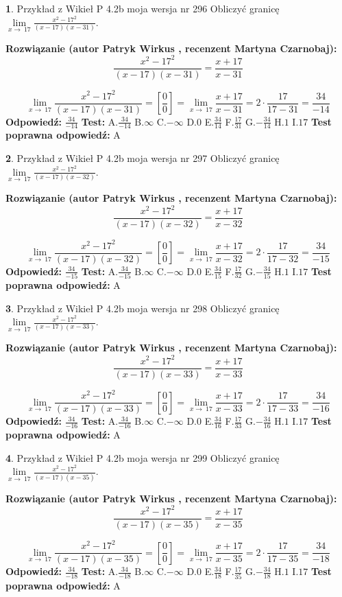 \documentclass[12pt, a4paper]{article}
\theoremstyle{definition} %
\newtheorem{zad}{}
\newcommand{\zadStart}[1]{\begin{zad}#1\newline}
\newcommand{\zadStop}{\end{zad}}
\newcommand{\rozwStart}[2]{\noindent \textbf{Rozwiązanie (autor #1 , recenzent #2): }\newline}
\newcommand{\rozwStop}{\newline}
\newcommand{\odpStart}{\noindent \textbf{Odpowiedź:}\newline}
\newcommand{\odpStop}{\newline}
\newcommand{\testStart}{\noindent \textbf{Test:}\newline}
\newcommand{\testStop}{\newline}
\newcommand{\kluczStart}{\noindent \textbf{Test poprawna odpowiedź:}\newline}
\newcommand{\kluczStop}{\newline}
\begin{document}
\zadStart{Przykład z Wikieł P 4.2b moja wersja nr 296}
Obliczyć granicę $\lim\limits_{x\to\ 17}\frac{x^{2}-17^{2}}{(x-17)(x-31)}$.
\zadStop
\rozwStart{Patryk Wirkus}{Martyna Czarnobaj}
$$\frac{x^{2}-17^{2}}{(x-17)(x-31)}=\frac{x+17}{x-31}$$

$$\lim\limits_{x\to\ 17}\frac{x^{2}-17^{2}}{(x-17)(x-31)}=[\frac{0}{0}]=\lim\limits_{x\to\ 17}\frac{x+17}{x-31}=2 \cdot \frac{17}{17-31} = \frac{34}{-14}$$
\rozwStop
\odpStart
$\frac{34}{-14}$
\odpStop
\testStart
A.$\frac{34}{-14}$
B.$\infty$
C.$-\infty$
D.$0$
E.$\frac{34}{14}$
F.$\frac{17}{31}$
G.$-\frac{34}{14}$
H.$1$
I.$17$
\testStop
\kluczStart
A
\kluczStop



\zadStart{Przykład z Wikieł P 4.2b moja wersja nr 297}
Obliczyć granicę $\lim\limits_{x\to\ 17}\frac{x^{2}-17^{2}}{(x-17)(x-32)}$.
\zadStop
\rozwStart{Patryk Wirkus}{Martyna Czarnobaj}
$$\frac{x^{2}-17^{2}}{(x-17)(x-32)}=\frac{x+17}{x-32}$$

$$\lim\limits_{x\to\ 17}\frac{x^{2}-17^{2}}{(x-17)(x-32)}=[\frac{0}{0}]=\lim\limits_{x\to\ 17}\frac{x+17}{x-32}=2 \cdot \frac{17}{17-32} = \frac{34}{-15}$$
\rozwStop
\odpStart
$\frac{34}{-15}$
\odpStop
\testStart
A.$\frac{34}{-15}$
B.$\infty$
C.$-\infty$
D.$0$
E.$\frac{34}{15}$
F.$\frac{17}{32}$
G.$-\frac{34}{15}$
H.$1$
I.$17$
\testStop
\kluczStart
A
\kluczStop



\zadStart{Przykład z Wikieł P 4.2b moja wersja nr 298}
Obliczyć granicę $\lim\limits_{x\to\ 17}\frac{x^{2}-17^{2}}{(x-17)(x-33)}$.
\zadStop
\rozwStart{Patryk Wirkus}{Martyna Czarnobaj}
$$\frac{x^{2}-17^{2}}{(x-17)(x-33)}=\frac{x+17}{x-33}$$

$$\lim\limits_{x\to\ 17}\frac{x^{2}-17^{2}}{(x-17)(x-33)}=[\frac{0}{0}]=\lim\limits_{x\to\ 17}\frac{x+17}{x-33}=2 \cdot \frac{17}{17-33} = \frac{34}{-16}$$
\rozwStop
\odpStart
$\frac{34}{-16}$
\odpStop
\testStart
A.$\frac{34}{-16}$
B.$\infty$
C.$-\infty$
D.$0$
E.$\frac{34}{16}$
F.$\frac{17}{33}$
G.$-\frac{34}{16}$
H.$1$
I.$17$
\testStop
\kluczStart
A
\kluczStop



\zadStart{Przykład z Wikieł P 4.2b moja wersja nr 299}
Obliczyć granicę $\lim\limits_{x\to\ 17}\frac{x^{2}-17^{2}}{(x-17)(x-35)}$.
\zadStop
\rozwStart{Patryk Wirkus}{Martyna Czarnobaj}
$$\frac{x^{2}-17^{2}}{(x-17)(x-35)}=\frac{x+17}{x-35}$$

$$\lim\limits_{x\to\ 17}\frac{x^{2}-17^{2}}{(x-17)(x-35)}=[\frac{0}{0}]=\lim\limits_{x\to\ 17}\frac{x+17}{x-35}=2 \cdot \frac{17}{17-35} = \frac{34}{-18}$$
\rozwStop
\odpStart
$\frac{34}{-18}$
\odpStop
\testStart
A.$\frac{34}{-18}$
B.$\infty$
C.$-\infty$
D.$0$
E.$\frac{34}{18}$
F.$\frac{17}{35}$
G.$-\frac{34}{18}$
H.$1$
I.$17$
\testStop
\kluczStart
A
\kluczStop
\end{document}
